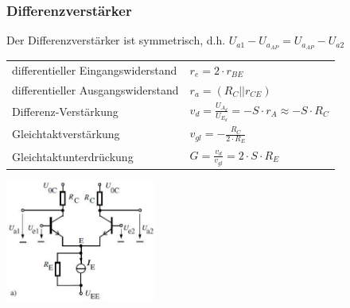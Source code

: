          \subsubsection{Differenzverstärker}
             \begin{minipage}[T]{12cm}
             	Der Differenzverstärker ist symmetrisch, d.h. $U_{a1} - U_{a_{AP}} = U_{a_{AP}} - U_{a2}$ \\
             	
             	\begin{tabular}{ll}
             	differentieller Eingangswiderstand & $r_e = 2 \cdot r_{BE}$ \\
             	differentieller Ausgangswiderstand & $r_a = (R_C || r_{CE})$ \\
				Differenz-Verstärkung & $v_d = \frac{U_{A_d}}{U_{E_d}} = -S\cdot r_A \approx -S\cdot R_C$ \\
				Gleichtaktverstärkung &  $v_{gl} = -\frac{R_C}{2\cdot R_E}$ \\
				Gleichtaktunterdrückung & $G = \frac{v_d}{v_{gl}} = 2\cdot S \cdot R_E$
				\end{tabular}
             \end{minipage}
             \begin{minipage}{4cm}
                 \includegraphics[height=4cm]{./images/BipTraDiffAmp.png}
             \end{minipage}\\
             
